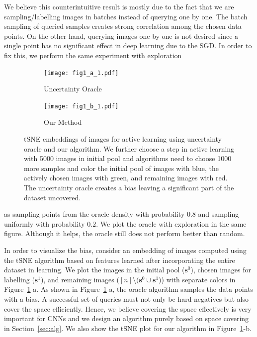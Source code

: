 \documentclass{article}
\begin{document}
We believe this counterintuitive result is mostly due to the fact that we are sampling/labelling images in batches instead of querying one by one. The batch sampling of queried samples creates strong correlation among the chosen data points.  On the other hand, querying images one by one is not desired since a single point has no significant effect in deep learning due to the SGD. In order to fix this, we perform the same experiment with exploration%
\begin{figure}
\vspace{-5mm}
  \begin{center}
    \begin{subfigure}[b]{0.23\textwidth}
		\texttt{[image: fig1\_a\_1.pdf]}
		\vspace{-7mm}
		\caption{Uncertainty Oracle}
    \end{subfigure}
    \begin{subfigure}[b]{0.23\textwidth}
		\texttt{[image: fig1\_b\_1.pdf]}
		\vspace{-7mm}
		\caption{Our Method}
    \end{subfigure}
\end{center}
\vspace{-3mm}
 \caption{tSNE embeddings of images for active learning using uncertainty oracle and our algorithm. We further choose a step in active learning with 5000 images in initial pool and algorithms need to choose 1000 more samples and color the initial pool of images with blue, the actively chosen images with green, and remaining images with red. The uncertainty oracle creates a bias leaving a significant part of the dataset uncovered. }
\label{fig:tsne}
\vspace{-5mm}
\end{figure}
 \noindent   as sampling points from the oracle density with probability $0.8$ and sampling uniformly with probability $0.2$. We plot the oracle with exploration in the same figure. Although it helps, the oracle still does not perform better than random.

In order to visualize the bias, consider an embedding of images computed using the tSNE\cite{tsne} algorithm based on features learned after incorporating the entire dataset in learning. We plot the images in the initial pool ($\mathbf{s}^0$), chosen images for labelling ($\mathbf{s}^1$), and remaining images ($[n] \setminus (\mathbf{s}^0 \cup \mathbf{s}^1$)) with separate colors in Figure~\ref{fig:tsne}-a. As shown in Figure~\ref{fig:tsne}-a, the oracle algorithm samples the data points with a bias. A successful set of queries must not only be hard-negatives but also cover the space efficiently. Hence, we believe covering the space effectively is very important for CNNs and we design an algorithm purely based on space covering in Section~\ref{sec:alg}. We also show the tSNE plot for our algorithm in Figure~\ref{fig:tsne}-b.
\end{document}
